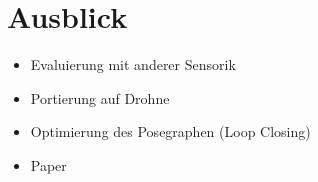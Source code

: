 \documentclass{beamer}
\begin{document}
\section*{Ausblick}
\begin{frame}{\secname}
\begin{itemize}
\item Evaluierung mit anderer Sensorik
\item Portierung auf Drohne
\item Optimierung des Posegraphen (Loop Closing)
\item Paper
\end{itemize}
\end{frame}
\end{document}
